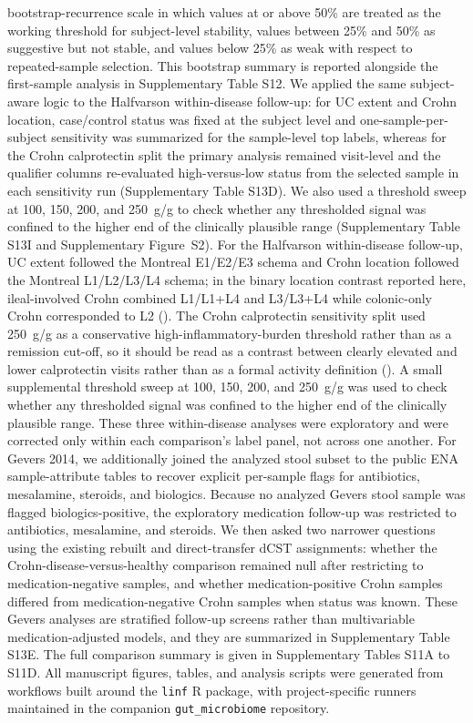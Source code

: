 \documentclass[
  11pt,
]{article}
\begin{document}
bootstrap-recurrence scale in which values at or above 50\% are treated
as the working threshold for subject-level stability, values between
25\% and 50\% as suggestive but not stable, and values below 25\% as
weak with respect to repeated-sample selection.
This bootstrap summary is reported alongside the first-sample analysis in
Supplementary Table S12. We applied the same subject-aware logic to the
Halfvarson within-disease follow-up: for UC extent and Crohn location,
case/control status was fixed at the subject level and one-sample-per-subject
sensitivity was summarized for the sample-level top labels, whereas for the
Crohn calprotectin split the primary analysis remained visit-level and the
qualifier columns re-evaluated high-versus-low status from the selected sample
in each sensitivity run (Supplementary Table S13D). We also used a
threshold sweep at 100, 150, 200, and 250~\textmu g/g to check whether
any thresholded signal was confined to the higher end of the clinically
plausible range (Supplementary Table S13I and Supplementary Figure~S2).
For the Halfvarson within-disease follow-up, UC extent followed the
Montreal E1/E2/E3 schema and Crohn location followed the Montreal
L1/L2/L3/L4 schema; in the binary location contrast reported here,
ileal-involved Crohn combined L1/L1+L4 and L3/L3+L4 while colonic-only
Crohn corresponded to L2
(). The
Crohn calprotectin sensitivity split used 250~\textmu g/g as a
conservative high-inflammatory-burden threshold rather than as a
remission cut-off, so it should be read as a contrast between clearly
elevated and lower calprotectin visits rather than as a formal activity
definition (). A small supplemental threshold sweep at
100, 150, 200, and 250~\textmu g/g was used to check whether any
thresholded signal was confined to the higher end of the clinically
plausible range.
These three within-disease analyses were exploratory and were corrected
only within each comparison's label panel, not across one another.
For Gevers 2014, we additionally joined the analyzed stool subset to the
public ENA sample-attribute tables to recover explicit per-sample flags
for antibiotics, mesalamine, steroids, and biologics. Because no
analyzed Gevers stool sample was flagged biologics-positive, the
exploratory medication follow-up was restricted to antibiotics,
mesalamine, and steroids. We then asked two narrower questions using
the existing rebuilt and direct-transfer dCST assignments: whether the
Crohn-disease-versus-healthy comparison remained null after restricting
to medication-negative samples, and whether medication-positive Crohn
samples differed from medication-negative Crohn samples when status was
known. These Gevers analyses are stratified follow-up screens rather
than multivariable medication-adjusted models, and they are summarized
in Supplementary Table S13E.
The full comparison summary is given in Supplementary Tables S11A to
S11D. All
manuscript figures, tables, and analysis scripts were generated from
workflows built around the \texttt{linf} R package, with project-specific
runners maintained in the companion \texttt{gut\_microbiome} repository.
\end{document}
